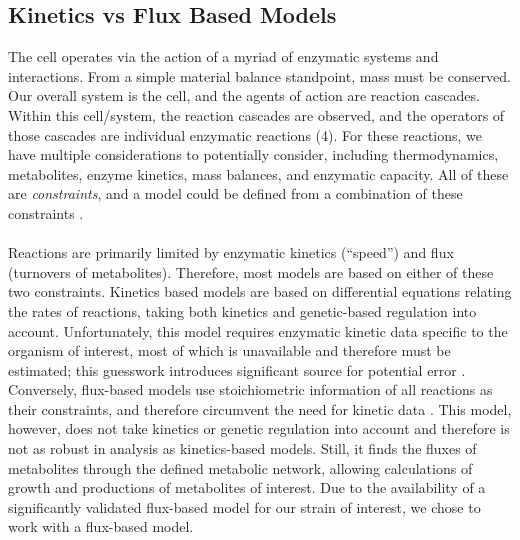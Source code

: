 \subsection{Kinetics vs Flux Based Models}
The cell operates via the action of a myriad of enzymatic systems and interactions. From a simple material balance standpoint, mass must be conserved. Our overall system is the cell, and the agents of action are reaction cascades. Within this cell/system, the reaction cascades are observed, and the operators of those cascades are individual enzymatic reactions (4). For these reactions, we have multiple considerations to potentially consider, including thermodynamics, metabolites, enzyme kinetics, mass balances, and enzymatic capacity. All of these are \textit{constraints}, and a model could be defined from a combination of these constraints \parencite{Yasemi2021}.  \\ \\
Reactions are primarily limited by enzymatic kinetics (“speed”) and flux (turnovers of metabolites). Therefore, most models are based on either of these two constraints. Kinetics based models are based on differential equations relating the rates of reactions, taking both kinetics and genetic-based regulation into account. Unfortunately, this model requires enzymatic kinetic data specific to the organism of interest, most of which is unavailable and therefore must be estimated; this guesswork introduces significant source for potential error \parencite{Yasemi2021}. Conversely, flux-based models use stoichiometric information of all reactions as their constraints, and therefore circumvent the need for kinetic data \parencite{Orth2010}. This model, however, does not take kinetics or genetic regulation into account and therefore is not as robust in analysis as kinetics-based models. Still, it finds the fluxes of metabolites through the defined metabolic network, allowing calculations of growth and productions of metabolites of interest. Due to the availability of a significantly validated flux-based model for our strain of interest, we chose to work with a flux-based model. 


